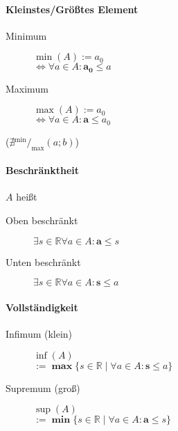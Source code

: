 \paragraph{Kleinstes/Grö\ss tes Element}

\begin{description}
      \item [Minimum]
            $\min(A) := a_0$ \\
            $\Leftrightarrow \forall a \in A: \mathbf{a_0} \boldsymbol{\leq} a$

      \item [Maximum]
            $\max(A) := a_0$ \\
            $\Leftrightarrow \forall a \in A: \mathbf{a} \boldsymbol{\leq} a_0$
\end{description}

($\nexists {}^{\min}/_{\max} (a;b)$)

\paragraph{Beschränktheit} $A$ hei\ss t

\begin{description}
      \item [Oben beschränkt]
            $\exists s \in \mathbb{R} \forall a \in A: \mathbf{a} \boldsymbol{\leq} s$

      \item [Unten beschränkt]
            $\exists s \in \mathbb{R} \forall a \in A: \mathbf{s} \boldsymbol{\leq} a$
\end{description}

\paragraph{Vollständigkeit}

\begin{description}
      \item [Infimum (klein)] $\inf(A)$ \\
            $:= \mathbf{\max} \{ s \in \mathbb{R} \mid \forall a \in A: \mathbf{s} \boldsymbol{\leq} a \}$

      \item [Supremum (gro\ss)] $\sup(A)$ \\
            $:= \mathbf{\min} \{ s \in \mathbb{R} \mid \forall a \in A: \mathbf{a} \boldsymbol{\leq} s \}$
\end{description}

